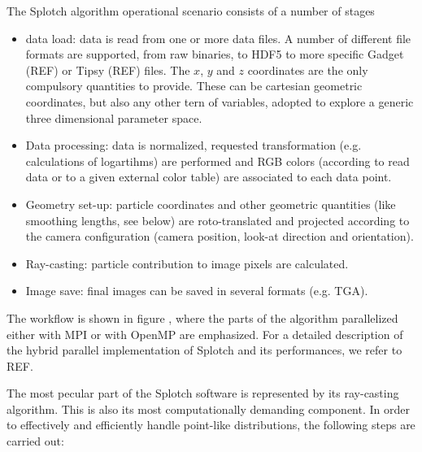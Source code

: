 \documentclass[11pt]{article}
\begin{document}
The Splotch algorithm operational scenario consists of a number of stages 
\begin{itemize}
\item
data load: data is read from one or more data files. A number of different file
formats are supported, from raw binaries, to HDF5 to more specific Gadget (REF) or Tipsy (REF)
files. The $x$, $y$ and $z$ coordinates are the only compulsory quantities to provide.
These can be cartesian geometric coordinates, but also any other tern 
of variables, adopted to explore a generic three dimensional parameter space.
\item
Data processing: data is normalized, requested 
transformation (e.g. calculations of logartihms) are performed
and RGB colors (according to read data or to a given
external color table) are associated to each data point. 
\item
Geometry set-up: particle coordinates and other geometric quantities 
(like smoothing lengths, see below) are roto-translated and projected according to the 
camera configuration (camera position, look-at direction and orientation). 
\item
Ray-casting: particle contribution to image pixels are calculated.
\item
Image save: final images can be saved in several formats (e.g. TGA).
\end{itemize}
The workflow is shown in figure , where the parts of the algorithm parallelized
either with MPI or with OpenMP are emphasized. For a detailed description of
the hybrid parallel implementation of Splotch and its performances, we refer to REF.


The most pecular part of the Splotch software is represented by its ray-casting algorithm.
This is also its most computationally demanding component.
In order to effectively and efficiently handle point-like distributions, the following 
steps are carried out: 
\end{document}
